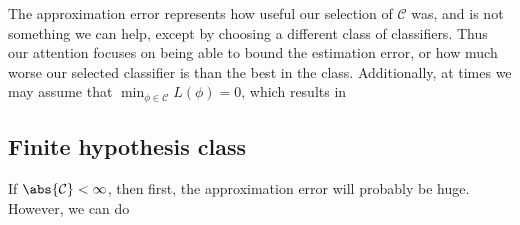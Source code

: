\documentclass[11pt]{article} %
\newcommand{\cls}{\mathcal{C}}
\begin{document}
The approximation error represents how useful our selection of $\cls$ was, and is not something we can help, except by choosing a different class of classifiers. Thus our attention focuses on being able to bound the estimation error, or how much worse our selected classifier is than the best in the class. Additionally, at times we may assume that $\min_{\phi \in \cls} L(\phi) = 0$, which results in 

\subsection{Finite hypothesis class}

If $\abs{ \cls} < \infty$, then first, the approximation error will probably be huge. However, we can do 
\end{document}
